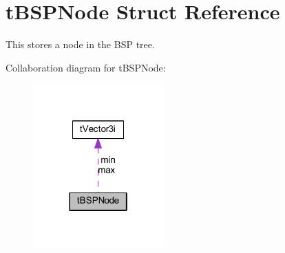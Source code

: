 \hypertarget{structt_b_s_p_node}{}\section{t\+B\+S\+P\+Node Struct Reference}
\label{structt_b_s_p_node}


This stores a node in the B\+SP tree.  




Collaboration diagram for t\+B\+S\+P\+Node\+:
\nopagebreak
\begin{figure}[H]
\begin{center}
\leavevmode
\includegraphics[width=142pt]{structt_b_s_p_node__coll__graph}
\end{center}
\end{figure}
